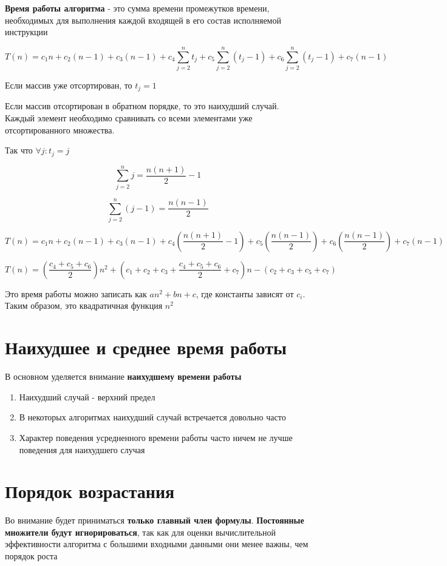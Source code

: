 \documentclass[a4paper, 12pt]{article}
\begin{document}
\begin{enumerate}
\textbf{Время работы алгоритма} - это сумма времени промежутков времени, необходимых для выполнения каждой входящей в его состав
исполняемой инструкции

\[T(n) = c_1n + c_2(n - 1) + c_3(n - 1) + c_4\sum_{j = 2}^n t_j + 
c_5 \sum_{j = 2}^n (t_j - 1) + c_6 \sum_{j = 2}^n (t_j - 1) + c_7(n - 1)\]

Если массив уже отсортирован, то $t_j = 1$

Если массив отсортирован в обратном порядке, то это наихудший случай. 
Каждый элемент необходимо сравнивать со всеми элементами уже отсортированного множества.

Так что $\forall j: t_j = j$

$$
    \sum_{j = 2}^n j = \frac{n(n + 1)}{2} - 1
$$

$$
    \sum_{j = 2}^n (j - 1) = \frac{n(n - 1)}{2}
$$

$$
    T(n) = c_1n + c_2(n - 1) + c_3(n - 1) + c_4(\frac{n(n + 1)}{2} - 1) + 
    c_5(\frac{n(n - 1)}{2}) + c_6(\frac{n(n - 1)}{2}) + c_7(n - 1)
$$

$$
    T(n) = (\frac{c_4 + c_5 + c_6}{2})n^2 + (c_1 + c_2 + c_3 + \frac{c_4 + c_5 + c_6}{2} + c_7)n - (c_2 + c_3 + c_5 + c_7)
$$

Это время работы можно записать как $an^2 + bn + c$, где константы зависят от $c_i$. Таким образом, это квадратичная функция $n^2$

\section{Наихудшее и среднее время работы}

В основном уделяется внимание \textbf{наихудшему времени работы}

\begin{enumerate}
    \item Наихудший случай - верхний предел
    \item В некоторых алгоритмах наихудший случай встречается довольно часто
    \item Характер поведения усредненного времени работы часто ничем не лучше поведения для наихудшего случая
\end{enumerate}

\section{Порядок возрастания}

Во внимание будет приниматься \textbf{только главный член формулы}. \textbf{Постоянные множители будут игнорироваться},
так как для оценки вычислительной эффективности алгоритма с большими входными данными они менее важны, чем порядок роста


\end{enumerate}
\end{document}

